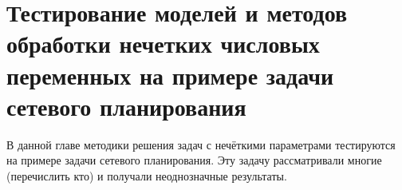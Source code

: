 \chapter{Тестирование моделей и методов обработки нечетких числовых переменных на примере задачи сетевого планирования}
\label{chapter3}

В данной главе методики решения задач с нечёткими параметрами тестируются на примере задачи сетевого планирования. Эту задачу рассматривали многие (перечислить кто) и получали неоднозначные результаты.






